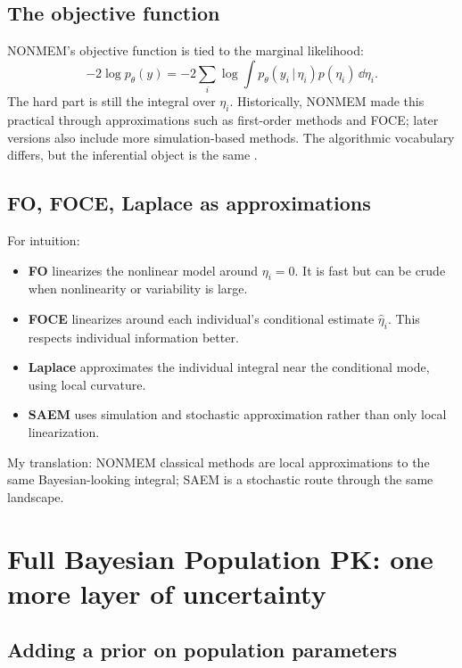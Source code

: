 \documentclass[a4paper]{article}
\newcommand{\given}{\,|\,}
\begin{document}
\subsection{The objective function}

NONMEM's objective function is tied to the marginal likelihood:
\[
  -2\log p_\theta(y)
  =
  -2\sum_i
  \log
  \int
  p_\theta(y_i\given \eta_i)
  p(\eta_i)\,\dd\eta_i.
\]
The hard part is still the integral over \(\eta_i\). Historically, NONMEM made this practical through approximations such as first-order methods and FOCE; later versions also include more simulation-based methods. The algorithmic vocabulary differs, but the inferential object is the same \cite{beal1980nonmem,lindstrom1990nlme}.

\subsection{FO, FOCE, Laplace as approximations}

For intuition:
\begin{itemize}[leftmargin=2em]
  \item \textbf{FO} linearizes the nonlinear model around \(\eta_i=0\). It is fast but can be crude when nonlinearity or variability is large.
  \item \textbf{FOCE} linearizes around each individual's conditional estimate \(\widehat\eta_i\). This respects individual information better.
  \item \textbf{Laplace} approximates the individual integral near the conditional mode, using local curvature.
  \item \textbf{SAEM} uses simulation and stochastic approximation rather than only local linearization.
\end{itemize}

\begin{remark}
  My translation: NONMEM classical methods are local approximations to the same Bayesian-looking integral; SAEM is a stochastic route through the same landscape.
\end{remark}

\section{Full Bayesian Population PK: one more layer of uncertainty}

\subsection{Adding a prior on population parameters}
\end{document}
